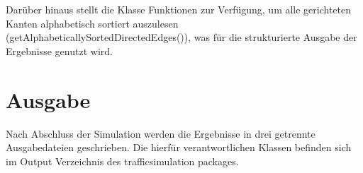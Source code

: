 \begin{figure}[h!]
    \centering
\end{figure}

\FloatBarrier
Darüber hinaus stellt die Klasse Funktionen zur Verfügung,
um alle gerichteten Kanten alphabetisch sortiert auszulesen (getAlphabeticallySortedDirectedEdges()),
was für die strukturierte Ausgabe der Ergebnisse genutzt wird.

\cleardoublepage

\section{Ausgabe}

Nach Abschluss der Simulation werden die Ergebnisse in drei getrennte Ausgabedateien geschrieben.
Die hierfür verantwortlichen Klassen befinden sich im Output Verzeichnis des trafficsimulation packages.

